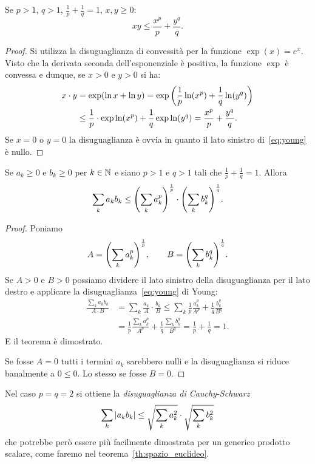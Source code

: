 \begin{theorem}%
\label{th:young}%
%
%
Se $p>1$, $q>1$, $\frac{1}{p}+\frac{1}{q}=1$, $x,y\ge 0$:
\begin{equation}\label{eq:young}
  x y \le \frac{x^p}{p} + \frac{y^q}{q}.
\end{equation}
\end{theorem}
%
\begin{proof}
Si utilizza la disuguaglianza di convessità per la funzione $\exp(x)=e^x$. 
Visto che la derivata seconda dell'esponenziale è positiva, la funzione $\exp$ 
è convessa e dunque, se $x>0$ e $y>0$ si ha:
\begin{align*}
 x\cdot y 
  &= \exp(\ln x + \ln y)
  = \exp{\left( \frac 1 p \ln (x^p) + \frac 1 q \ln (y^q) \right)}  \\
  &\le \frac 1 p \cdot \exp \ln (x^p) + \frac 1 q \exp \ln (y^q)
  = \frac{x^p}{p} + \frac{y^q}{q}.
\end{align*}
Se $x=0$ o $y=0$ la disuguaglianza è ovvia in quanto il lato sinistro 
di~\eqref{eq:young} è nullo.
\end{proof}

\begin{theorem}
Se $a_k\ge 0$ e $b_k\ge 0$ per $k\in {\mathbb N}$
e siano $p>1$ e $q>1$ tali che $\frac 1 p + \frac 1 q = 1$.
Allora 
\[
 \sum_k a_k b_k  \le {\left( \sum_k a_k^p \right)}^{1 \over p} \cdot {\left( \sum_k b_k^q \right)}^{1\over q}.
\]
\end{theorem}
\begin{proof}
Poniamo 
\[
A = {\left( \sum_k a_k^p \right)}^{1 \over p}, \qquad 
B = {\left( \sum_k b_k^q \right)}^{1\over q}.
\]
Se $A>0$ e $B>0$ possiamo dividere il lato sinistro della disuguaglianza 
per il lato destro e applicare la disuguaglianza~\eqref{eq:young} di Young:
\begin{align*}
  \frac{\sum_k a_k b_k}{A\cdot B} 
  & = \sum_k \frac{a_k}{A}\cdot \frac{b_k}{B} 
  \le \sum_k \frac 1 p \frac{a_k^p}{A^p} + \frac 1 q \frac{b_k^q}{B^q} \\
  &= \frac 1 p \frac{\sum_k a_k^p}{A^p} + \frac 1 q \frac{\sum_k b_k^q}{B^q}
  = \frac 1 p + \frac 1 q = 1.
\end{align*}
E il teorema è dimostrato. 

Se fosse $A=0$ tutti i termini $a_k$ sarebbero nulli e la disuguaglianza 
si riduce banalmente a $0\le 0$. Lo stesso se fosse $B=0$.  
\end{proof}

Nel caso $p=q=2$ si ottiene la 
\emph{disuguaglianza di Cauchy-Schwarz}%
%
%
%
%
\[
   \sum_k {\left|a_k b_k\right|} \le \sqrt{\sum_k a_k^2} \cdot \sqrt{\sum_k b_k^2}
\]
che potrebbe però essere più facilmente dimostrata 
per un generico prodotto scalare, come faremo 
nel teorema~\ref{th:spazio_euclideo}.

